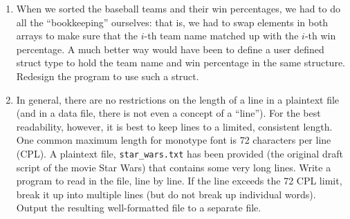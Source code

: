 \documentclass[12pt]{scrartcl}
\begin{document}
\begin{enumerate}
  \item When we sorted the baseball teams and their win percentages, we had 
  	to do all the ``bookkeeping'' ourselves: that is, we had to swap elements 
	in both arrays to make sure that the $i$-th team name matched up with the 
	$i$-th win percentage.  A much better way would have been to define a 
	user defined struct type to hold the team name and win percentage in 
	the same structure.  Redesign the program to use such a struct.
  \item In general, there are no restrictions on the length of a line in a plaintext 
	file (and in a data file, there is not even a concept of a ``line'').  For the best 
	readability, however, it is best to keep lines to a limited, consistent length.  
	One common maximum length for monotype font is 72 characters per 
	line (CPL).  A plaintext file, \texttt{star_wars.txt} has been provided (the 
	original draft script of the movie Star Wars) that contains some very long 
	lines.  Write a program to read in the file, line by line.  If the line exceeds 
	the 72 CPL limit, break it up into multiple lines (but do not break up individual 
	words).  Output the resulting well-formatted file to a separate file.
\end{enumerate}
\end{document}

